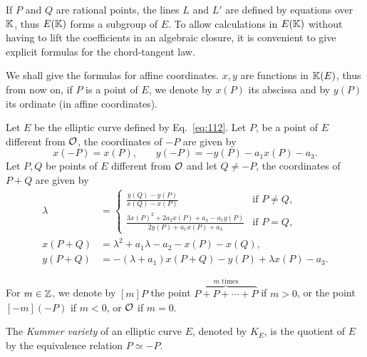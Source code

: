 If $P$ and $Q$ are rational points, the lines $L$ and $L'$ are defined
by equations over $\mathbb{K}$, thus $E(\mathbb{K})$ forms a subgroup of $E$. To allow
calculations in $E(\mathbb{K})$ without having to lift the coefficients in an
algebraic closure, it is convenient to give explicit formulas for the
chord-tangent law. 

We shall give the formulas for affine coordinates. $x,y$ are functions
in $\mathbb{K}(E)$, thus from now on, if $P$ is a point of $E$, we denote by
$x(P)$ its abscissa and by $y(P)$ its ordinate (in affine coordinates).

\begin{proposition}
  Let $E$ be the elliptic curve defined by Eq.~\eqref{eq:112}. Let
  $P$, be a point of $E$ different from $\mathcal{O}$, the coordinates of $-P$
  are given by
  \begin{equation}
    \label{eq:120}
    x(-P) = x(P)\text{,}\qquad y(-P)=-y(P) -a_1x(P) - a_3
    \text{.}
  \end{equation}
  Let $P,Q$ be points of $E$ different from $\mathcal{O}$ and let $Q\ne-P$, the
  coordinates of $P+Q$ are given by
  \begin{equation}
    \label{eq:121}
    \begin{aligned}
      \lambda &= \begin{cases}
        \frac{y(Q) - y(P)}{x(Q) -x(P)} &\text{if $P\ne Q$,}\\
        \frac{3x(P)^2+2a_2x(P)+a_4-a_1y(P)}{2y(P)+a_1x(P)+a_3} &\text{if $P=Q$,}
      \end{cases}\\
      x(P+Q) &= \lambda^2+a_1\lambda-a_2-x(P)-x(Q)\text{,}\\
      y(P+Q) &= -(\lambda+a_1)x(P+Q) - y(P) + \lambda x(P)-a_3\text{.}
    \end{aligned}
  \end{equation}
\end{proposition}

For $m\in\mathbb{Z}$, we denote by $[m]P$ the point
 $\overbrace{P+P+\cdots+P}^{m\text{ times}}$ if $m>0$, or the
point $[-m](-P)$ if $m<0$, or $\mathcal{O}$ if $m=0$. 

\begin{definition}
  \label{def:kummer}
  The \emph{Kummer variety} of an elliptic curve
  $E$, denoted by $K_E$, is the quotient of $E$ by the equivalence
  relation $P\simeq-P$.
\end{definition}

